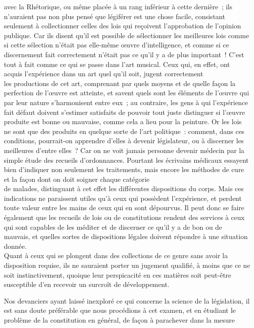 \documentclass[french,twoside]{book} %
\begin{document}
avec la Rhétorique, ou même placée à un rang inférieur à cette dernière ; ils n’auraient pas non plus pensé que légiférer est une chose facile, consistant seulement à collectionner celles des lois qui reçoivent l’approbation de l’opinion publique. Car ils disent qu’il est possible de sélectionner les meilleures lois comme si cette sélection n’était pas elle-même œuvre d’intelligence, et comme si ce discernement fait correctement n’était pas ce qu’il y a de plus important ! C’est tout à fait comme ce qui se passe dans l’art musical. Ceux qui, en effet, ont acquis l’expérience dans un art quel qu’il soit, jugent correctement \\
les productions de cet art, comprenant par quels moyens et de quelle façon la perfection de l’œuvre est atteinte, et savent quels sont les éléments de l’œuvre qui par leur nature s’harmonisent entre eux ; au contraire, les gens à qui l’expérience fait défaut doivent s’estimer satisfaits de pouvoir tout juste distinguer si l’œuvre produite est bonne ou mauvaise, comme cela a lieu pour la peinture. Or les lois ne sont que des produits  en quelque sorte de l’art politique : comment, dans ces conditions, pourrait-on apprendre d’elles à devenir législateur, ou à discerner les meilleures d’entre elles ? Car on ne voit jamais personne devenir médecin par la simple étude des recueils d’ordonnances. Pourtant les écrivains médicaux essayent bien d’indiquer non seulement les traitements, mais encore les méthodes de cure et la façon dont on doit soigner chaque catégorie \\
de malades, distinguant à cet effet les différentes dispositions du corps. Mais ces indications ne paraissent utiles qu’à ceux qui possèdent l’expérience, et perdent toute valeur entre les mains de ceux qui en sont dépourvus. Il peut donc se faire également que les recueils de lois ou de constitutions rendent des services à ceux qui sont capables de les méditer et de discerner ce qu’il y a de bon ou de mauvais, et quelles sortes de dispositions légales doivent répondre à une situation donnée. \\
Quant à ceux qui se plongent dans des collections de ce genre sans avoir la disposition requise, ils ne sauraient porter un jugement qualifié, à moins que ce ne soit instinctivement, quoique leur perspicacité en ces matières soit peut-être susceptible d’en recevoir un surcroît de développement.\par
Nos devanciers ayant laissé inexploré ce qui concerne la science de la législation, il est sans doute préférable que nous procédions à cet examen, et en étudiant le problème de la constitution en général, de façon à parachever dans la mesure \\
\end{document}
